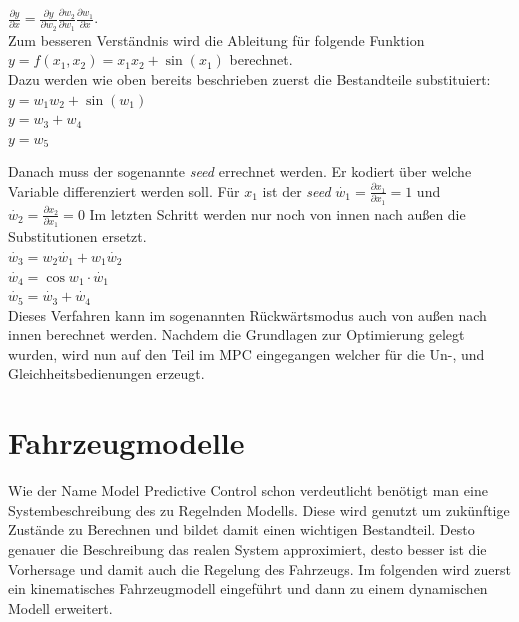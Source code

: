 \documentclass{like}
\begin{document}
$\frac{\partial y}{\partial x} = \frac{\partial y}{\partial w_2} \frac{\partial w_2}{\partial w_1} \frac{\partial w_1}{\partial x}$. \\
Zum besseren Verständnis wird die Ableitung für folgende Funktion
$y = f(x_1, x_2) = x_1x_2 + \sin(x_1)$ berechnet.\\
Dazu werden wie oben bereits beschrieben zuerst die Bestandteile substituiert:\\
$y = w_1w_2 + \sin(w_1) $ \\
$y = w_3 + w_4$ \\
$y = w_5$

Danach muss der sogenannte \textit{seed} errechnet werden. Er kodiert über welche Variable differenziert werden soll. Für $x_1$ ist der \textit{seed} $\dot{w_1} = \frac{\partial x_1}{\partial x_1} = 1$ und   $\dot{w_2} = \frac{\partial x_2}{\partial x_1} = 0$
Im letzten Schritt werden nur noch von innen nach außen die Substitutionen ersetzt. \\
$\dot{w_3} = w_2\dot{w_1} + w_1 \dot{w_2}$ \\
$\dot{w_4} = \cos{w_1} \cdot \dot{w_1}$ \\
$\dot{w_5} = \dot{w_3} + \dot{w_4}$ \\
Dieses Verfahren kann im sogenannten Rückwärtsmodus auch von außen nach innen berechnet werden. Nachdem die Grundlagen zur Optimierung gelegt wurden, wird nun auf den Teil im \acl{MPC} eingegangen welcher für die Un-, und Gleichheitsbedienungen erzeugt. 

\section{Fahrzeugmodelle}

Wie der Name Model Predictive Control schon verdeutlicht benötigt man eine Systembeschreibung des zu Regelnden Modells. Diese wird genutzt um zukünftige Zustände zu Berechnen und bildet damit einen wichtigen Bestandteil. Desto genauer die Beschreibung das realen System approximiert, desto besser ist die Vorhersage und damit auch die Regelung des Fahrzeugs.
Im folgenden wird zuerst ein kinematisches Fahrzeugmodell eingeführt und dann zu einem dynamischen Modell erweitert.   
\end{document}
